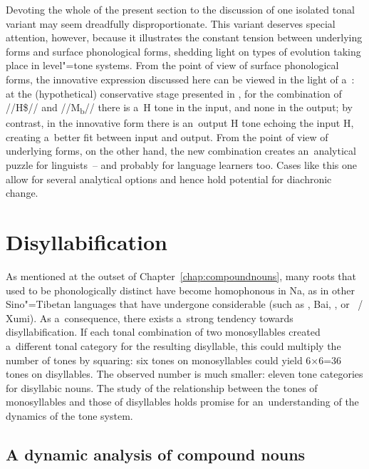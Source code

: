 Devoting the whole of the present section to the discussion of one isolated tonal variant may seem
dreadfully disproportionate. This variant deserves special attention, however, because it illustrates the
constant tension between underlying forms and surface phonological forms, shedding light on types of
evolution taking place in level"=tone systems. From the point of view of surface phonological forms,
the innovative expression discussed here can be viewed in the light of a~: at the
(hypothetical) conservative stage presented in , for the combination of \mbox{//H\$//} and \mbox{//M\textsubscript{b}//} there is
a~H tone in the input, and none in the output; by contrast, in the innovative form there is
an~output H tone echoing the input H, creating a~better fit between input and output. From the
point of view of underlying forms, on the other hand, the new combination creates an~analytical puzzle for linguists~-- and probably for language learners too. Cases like this one allow for
several analytical options and hence hold potential for {diachronic} change.

\section{Disyllabification}
\label{sec:disyllabification}


As mentioned at the outset of Chapter~\ref{chap:compoundnouns}, many roots that used to be phonologically
distinct have become homophonous in Na, as in other Sino"=Tibetan languages that have undergone
considerable  (such as , Bai, , or ~/ Xumi). As a~consequence, there
exists a~strong tendency towards disyllabification. If each tonal combination of two
monosyllables created a~different tonal category for the resulting disyllable, this could
multiply the number of tones by squaring: six tones on monosyllables could yield 6×6=36 tones on
disyllables. The observed number is much smaller: eleven tone categories for disyllabic nouns. The study of the relationship between the tones of monosyllables and those of disyllables
holds promise for an~understanding of the dynamics of the tone system.


\subsection{A dynamic analysis of compound nouns}
\label{sec:adynamicanalysisofcompoundnouns}


